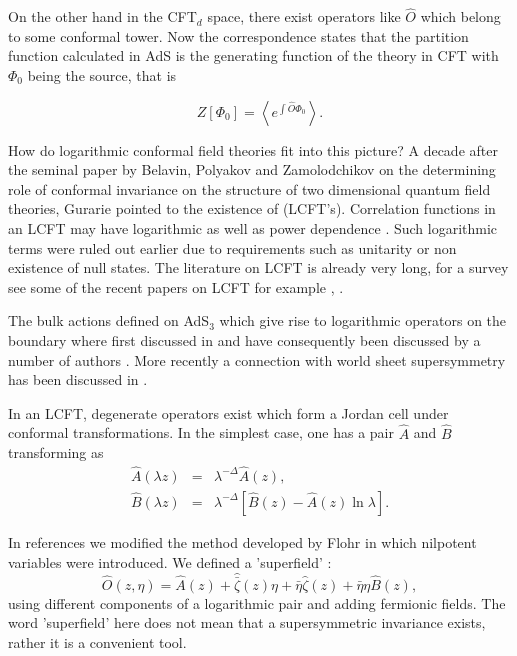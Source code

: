 \documentclass[a4paper,11pt]{article}
\begin{document}
On the other hand in the CFT$_{d}$ space, there exist operators
like $\hat{O}$ which belong to some conformal tower. Now the
correspondence states that the partition function calculated in
AdS is the generating function of the theory in CFT with $\Phi_0$
being the source, that is

\begin{equation}\label{AdS/CFT}
Z[\Phi_0]=\left\langle e^{\int\hat{O}\Phi_0} \right\rangle.
\end{equation}

How do logarithmic conformal field theories fit into this
picture? A decade after the seminal paper by Belavin, Polyakov and
Zamolodchikov \cite {BPZ} on the determining role of conformal
invariance on the structure of two dimensional quantum field
theories, Gurarie \cite{Gur} pointed to the existence of
(LCFT's). Correlation functions in an LCFT may have logarithmic
as well as power dependence \cite{Kogan}. Such logarithmic terms
were ruled out earlier due to requirements such as unitarity or
non existence of null states. The literature on LCFT is already
very long, for a survey see some of the recent papers on LCFT for
example \cite{FlohrNew}, \cite{Lewis}.

The bulk actions defined on AdS$_{3}$ which give rise to
logarithmic operators on the boundary where first discussed in
\cite{Khorrami,KoganAds} and have consequently been discussed by
a number of authors \cite{Lewis,many}. More recently a connection with
world sheet supersymmetry has been discussed in
\cite{KoganPolyakov}.

In an LCFT, degenerate operators exist which form a Jordan cell
under conformal transformations. In the simplest case, one has a
pair $\hat{A}$ and $\hat{B}$ transforming as
\begin{eqnarray}
\hat{A}(\lambda z)&=&\lambda^{-\Delta}\hat{A}(z) ,  \nonumber \\
\hat{B}(\lambda z)&=&\lambda^{-\Delta}[\hat{B}(z)-\hat{A}(z)\ln
\lambda] .
\end{eqnarray}

In references \cite{MRS,MRSAlgeb} we modified the method developed
by Flohr \cite{Flohr} in which nilpotent variables were
introduced. We defined a 'superfield' :
\begin{equation} \label{OF}
\hat{O}(z,\eta)= \hat{A}(z) + \hat{\bar{\zeta}}(z) \eta
+\bar{\eta} \hat{\zeta}(z) + \bar{\eta} \eta \hat{B}(z),
\end{equation}
using different components of a logarithmic pair and adding
fermionic fields. The word 'superfield' here does not mean that a
supersymmetric invariance exists, rather it is a convenient tool.
\end{document}
